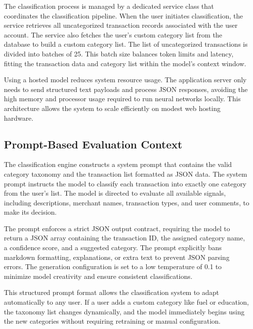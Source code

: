 The classification process is managed by a dedicated service class that coordinates the classification pipeline. When the user initiates classification, the service retrieves all uncategorized transaction records associated with the user account. The service also fetches the user's custom category list from the database to build a custom category list. The list of uncategorized transactions is divided into batches of 25. This batch size balances token limits and latency, fitting the transaction data and category list within the model's context window.

Using a hosted model reduces system resource usage. The application server only needs to send structured text payloads and process JSON responses, avoiding the high memory and processor usage required to run neural networks locally. This architecture allows the system to scale efficiently on modest web hosting hardware.

\subsection{Prompt-Based Evaluation Context}
The classification engine constructs a system prompt that contains the valid category taxonomy and the transaction list formatted as JSON data. The system prompt instructs the model to classify each transaction into exactly one category from the user's list. The model is directed to evaluate all available signals, including descriptions, merchant names, transaction types, and user comments, to make its decision.

The prompt enforces a strict JSON output contract, requiring the model to return a JSON array containing the transaction ID, the assigned category name, a confidence score, and a suggested category. The prompt explicitly bans markdown formatting, explanations, or extra text to prevent JSON parsing errors. The generation configuration is set to a low temperature of 0.1 to minimize model creativity and ensure consistent classifications.

This structured prompt format allows the classification system to adapt automatically to any user. If a user adds a custom category like fuel or education, the taxonomy list changes dynamically, and the model immediately begins using the new categories without requiring retraining or manual configuration.

